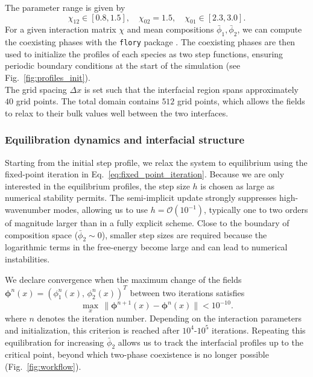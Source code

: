 \documentclass[12pt]{article}
\begin{document}
The parameter range is given by
\begin{equation}
    \chi_{12}\in[0.8,1.5],\quad \chi_{02}=1.5, \quad \chi_{01}\in[2.3, 3.0].
    \label{eq:interaction_parameters}
\end{equation}
For a given interaction matrix \(\chi\) and mean compositions \(\bar\phi_1, \bar\phi_2\), we can compute the coexisting phases with the \texttt{flory} package \cite{Yicheng2025flory}.
The coexisting phases are then used to initialize the profiles of each species as two step functions, ensuring periodic boundary conditions at the start of the simulation (see Fig.~\ref{fig:profiles_init}).\\
The grid spacing \(\Delta x\) is set such that the interfacial region spans approximately
\(40\) grid points. The total domain contains \(512\) grid points, which allows the fields to relax to
their bulk values well between the two interfaces.





\subsubsection{Equilibration dynamics and interfacial structure}

Starting from the initial step profile, we relax the system to equilibrium using the fixed-point iteration in Eq.~\eqref{eq:fixed_point_iteration}. Because we are only interested in the equilibrium profiles, the step size \(h\) is chosen as large as numerical stability permits. The semi-implicit update strongly suppresses high-wavenumber modes, allowing us to use \(h=\mathcal{O}(10^{-1})\), typically one to two orders of magnitude larger than in a fully explicit scheme.
Close to the boundary of composition space (\(\bar\phi_2 \sim 0\)), smaller step sizes are required because the logarithmic terms in the free-energy become large and can lead to numerical instabilities.

We declare convergence when the maximum change of the fields \(\boldsymbol\phi^n(x) =(\phi_1^n(x),\,\phi_2^n(x))^T\) between two iterations satisfies
\[
\max_x\, \lVert \boldsymbol{\phi}^{n+1}(x)-\boldsymbol{\phi}^{n}(x)\rVert < 10^{-10}.
\]
where \(n\) denotes the iteration number.
Depending on the interaction parameters and initialization, this criterion is reached after \(10^4\)-\(10^5\) iterations.
Repeating this equilibration for increasing \(\bar\phi_2\) allows us to track the interfacial profiles up to the critical point,
beyond which two-phase coexistence is no longer possible (Fig.~\ref{fig:workflow}).\\
\end{document}
